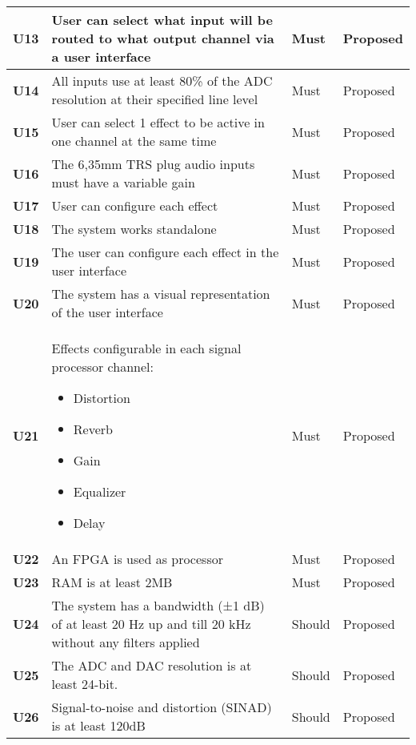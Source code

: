 \begin{longtable}{|l|p{10cm}|l|l|}
	\textbf{U13}&User can select what input will be routed to what output channel via a user interface							& Must   & Proposed\\ \hline
	\textbf{U14}&All inputs use at least 80\% of the ADC resolution at their specified line level								& Must   & Proposed\\ \hline
	\textbf{U15}&User can select 1 effect to be active in one channel at the same time											& Must   & Proposed\\ \hline
	\textbf{U16}&The 6,35mm TRS plug audio inputs must have a variable gain														& Must   & Proposed\\ \hline
	\textbf{U17}&User can configure each effect															 						& Must   & Proposed\\ \hline
	\textbf{U18}&The system works standalone																					& Must   & Proposed\\ \hline
	\textbf{U19}&The user can configure each effect in the user interface														& Must   & Proposed\\ \hline
	\textbf{U20}&The system has a visual representation of the user interface													& Must   & Proposed\\ \hline
	\textbf{U21}&Effects configurable in each signal processor channel: \newline
	\begin{itemize}
		\setlength\itemsep{-0.4em}
		\item Distortion
		\item Reverb
		\item Gain
		\item Equalizer
		\item Delay
	\end{itemize}																												& Must 	 & Proposed\\ \hline
	\textbf{U22} &An FPGA is used as processor																 					& Must   & Proposed\\ \hline
	\textbf{U23} &RAM is at least 2MB																		 					& Must   & Proposed\\ \hline
	\textbf{U24} &The system has a bandwidth (±1 dB) of at least 20 Hz up and till 20 kHz without any filters applied 			& Should & Proposed\\ \hline
	\textbf{U25} &The ADC and DAC resolution is at least 24-bit.																& Should & Proposed\\ \hline
	\textbf{U26} &Signal-to-noise and distortion (SINAD) is at least 120dB 														& Should & Proposed\\ \hline

\end{longtable}
